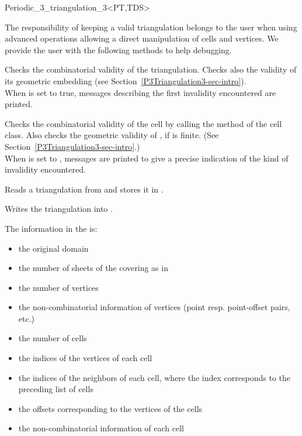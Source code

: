 \begin{ccRefClass}{Periodic_3_triangulation_3<PT,TDS>}
\begin{ccAdvanced}
The responsibility of keeping a valid triangulation belongs to the user
when using advanced operations allowing a direct manipulation of cells
and vertices. We provide the user with the following methods to help
debugging. 

{Checks the combinatorial validity of the triangulation. Checks also the
validity of its geometric embedding (see
Section~\ref{P3Triangulation3-sec-intro}).\\ When 
is set to true, messages describing the first invalidity encountered
are printed.} 

{Checks the combinatorial validity of the cell by calling the
 method of the  cell
class. Also checks the geometric validity of , if  is
finite. (See Section~\ref{P3Triangulation3-sec-intro}.)\\ 
When  is set to , messages are printed to give
a precise indication of the kind of invalidity encountered.}

\end{ccAdvanced}


{Reads a triangulation from  and stores it in .
}

{Writes the triangulation  into .}

The information in the  is:
\begin{itemize}
\item the original domain
\item the number of sheets of the covering as in
\item the number of vertices
\item the non-combinatorial information of vertices (point
  resp. point-offset pairs, etc.)
\item the number of cells
\item the indices of the vertices of each cell
\item the indices of the neighbors of each cell, where the index
  corresponds to the preceding list of cells
\item the offsets corresponding to the vertices of the cells
\item the non-combinatorial information of each cell
\end{itemize}

\ccSeeAlso



\end{ccRefClass}

